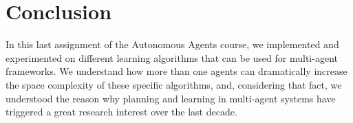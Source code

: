 \documentclass[a4paper,11pt]{article}
\begin{document}
\newpage

\section{Conclusion}
In this last assignment of the Autonomous Agents course, we implemented and experimented on different learning algorithms that can be used for multi-agent frameworks. We understand how more than one agents can dramatically increase the space complexity of these specific algorithms, and, considering that fact, we understood the reason why planning and learning in multi-agent systems have triggered a great research interest over the last decade.
\end{document}
